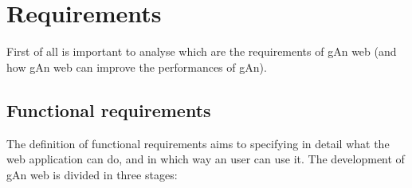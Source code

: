 
\chapter{Requirements} %

\label{Chapter2} %


First of all is important to analyse which are the requirements of gAn web (and how gAn web can improve the performances of gAn). 

\section{Functional requirements}
The definition of functional requirements aims to specifying in detail what the web application can do, and in which way an user can use it. The development of gAn web is divided in three stages: 

